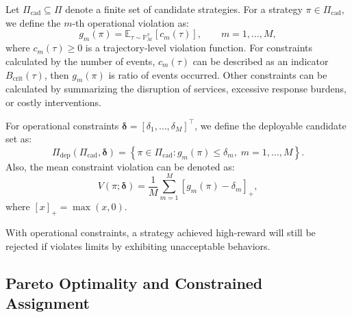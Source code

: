 \documentclass[sigconf,review,anonymous]{acmart}
\begin{document}
Let \(\Pi_{\mathrm{cad}} \subseteq \mathcal{\Pi}\) denote a finite set of candidate strategies. 
For a strategy \(\pi\in\Pi_{\mathrm{cad}}\), we define the \(m\)-th operational violation as:
\begin{equation}
g_m(\pi)
=
\mathbb{E}_{\tau\sim\mathbb{P}_{\mathcal{M}}^\pi}
\left[
c_m(\tau)
\right],
\qquad
m=1,\ldots,M ,
\label{eq:constraint-expectation}
\end{equation}
where \(c_m(\tau)\geq 0\) is a trajectory-level violation function. 
For constraints calculated by the number of events, \(c_m(\tau)\) can be described as an indicator \(B_{\mathrm{crit}}(\tau)\), then \(g_m(\pi)\) is ratio of events occurred. 
Other constraints can be calculated by summarizing the disruption of services, excessive response burdens, or costly interventions.

For operational constraints \(\boldsymbol{\delta}=[\delta_1,\ldots,\delta_M]^\top\), we define the deployable
candidate set as:
\begin{equation}
\Pi_{\mathrm{dep}}(\Pi_{\mathrm{cad}},\boldsymbol{\delta})
=
\left\{
\pi \in \Pi_{\mathrm{cad}}:
g_m(\pi)\leq \delta_m,
\; m=1,\ldots,M
\right\}.
\label{eq:acceptable-archive}
\end{equation}
Also, the mean constraint violation can be denoted as:
\begin{equation}
V(\pi;\boldsymbol{\delta})
=
\frac{1}{M}
\sum_{m=1}^{M}
\left[
g_m(\pi)-\delta_m
\right]_+ ,
\label{eq:mean-violation}
\end{equation}
where \([x]_+=\max(x,0)\).

With operational constraints, a strategy achieved high-reward will still be rejected if violates limits by exhibiting unacceptable behaviors.

\subsection{Pareto Optimality and Constrained Assignment}
\label{subsec:acceptable-pareto-assignment}
\end{document}
